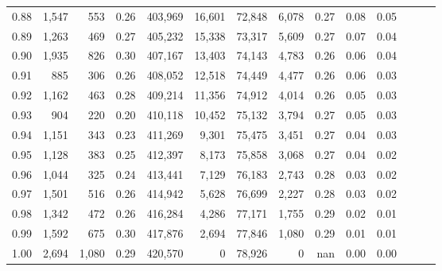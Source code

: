 \begin{tabular}{rrrrrrrrrrrrrr}
0.88 &   1,547 &    553 &  0.26 &  403,969 &   16,601 &  72,848 &   6,078 &  0.27 &  0.08 &      0.05 \\
0.89 &   1,263 &    469 &  0.27 &  405,232 &   15,338 &  73,317 &   5,609 &  0.27 &  0.07 &      0.04 \\
0.90 &   1,935 &    826 &  0.30 &  407,167 &   13,403 &  74,143 &   4,783 &  0.26 &  0.06 &      0.04 \\
0.91 &     885 &    306 &  0.26 &  408,052 &   12,518 &  74,449 &   4,477 &  0.26 &  0.06 &      0.03 \\
0.92 &   1,162 &    463 &  0.28 &  409,214 &   11,356 &  74,912 &   4,014 &  0.26 &  0.05 &      0.03 \\
0.93 &     904 &    220 &  0.20 &  410,118 &   10,452 &  75,132 &   3,794 &  0.27 &  0.05 &      0.03 \\
0.94 &   1,151 &    343 &  0.23 &  411,269 &    9,301 &  75,475 &   3,451 &  0.27 &  0.04 &      0.03 \\
0.95 &   1,128 &    383 &  0.25 &  412,397 &    8,173 &  75,858 &   3,068 &  0.27 &  0.04 &      0.02 \\
0.96 &   1,044 &    325 &  0.24 &  413,441 &    7,129 &  76,183 &   2,743 &  0.28 &  0.03 &      0.02 \\
0.97 &   1,501 &    516 &  0.26 &  414,942 &    5,628 &  76,699 &   2,227 &  0.28 &  0.03 &      0.02 \\
0.98 &   1,342 &    472 &  0.26 &  416,284 &    4,286 &  77,171 &   1,755 &  0.29 &  0.02 &      0.01 \\
0.99 &   1,592 &    675 &  0.30 &  417,876 &    2,694 &  77,846 &   1,080 &  0.29 &  0.01 &      0.01 \\
1.00 &   2,694 &  1,080 &  0.29 &  420,570 &        0 &  78,926 &       0 &   nan &  0.00 &      0.00 \\
\bottomrule
\end{tabular}
